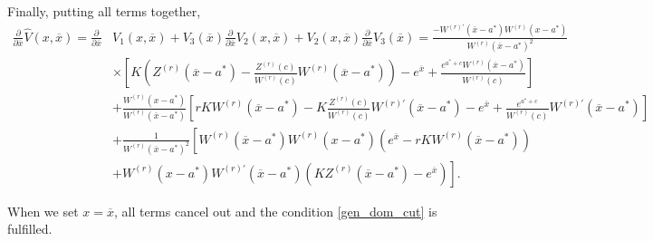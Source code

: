 \documentclass[10pt]{amsart}
\begin{document}
		Finally, putting all terms together,
		\begin{align}
			\frac{\partial}{\partial \overline{x}} \hat{V}(x, \overline{x})=\frac{\partial}{\partial \overline{x}}& V_1(x, \overline{x}) + V_3(\overline{x})\frac{\partial}{\partial \overline{x}} V_2(x, \overline{x}) +  V_2(x, \overline{x})\frac{\partial}{\partial \overline{x}} V_3(\overline{x}) =  \frac{-W^{(r)'}(\overline{x}-a^*)W^{(r)}(x-a^*)}{W^{(r)}(\overline{x}-a^*)^2}
			\\
			\nonumber &\times \left[ K\left( Z^{(r)}(\overline{x}-a^*) - \frac{Z^{(r)}(c)}{W^{(r)}(c)}W^{(r)}(\overline{x}-a^*)\right) - e^{\overline{x}}  + \frac{e^{a^*+c}W^{(r)}(\overline{x}-a^*)}{W^{(r)}(c)}  \right] \\
			\nonumber & + \frac{W^{(r)}(x-a^*)}{W^{(r)}(\overline{x}-a^*)} \left[ rKW^{(r)}(\overline{x}-a^*) - K\frac{Z^{(r)}(c)}{W^{(r)}(c)}W^{(r)'}(\overline{x}-a^*) - e^{\overline{x}} + \frac{e^{a^*+c}}{W^{(r)}(c)}W^{(r)'}(\overline{x}-a^*) \right] \\
			\nonumber & + \frac{1}{W^{(r)}(\overline{x}-a^*)^2} \left[ W^{(r)}(\overline{x}-a^*)W^{(r)}(x-a^*)\left( e^{\overline{x}} - rKW^{(r)}(\overline{x}-a^*) \right) \right. \\
			\nonumber & \left. + W^{(r)}(x-a^*)W^{(r)'}(\overline{x}-a^*) \left( KZ^{(r)}(\overline{x}-a^*) - e^{\overline{x}} \right) \right].
		\end{align}
		
		When we set $x = \overline{x}$, all terms cancel out and the condition \eqref{gen_dom_cut} is fulfilled.
		
		
\end{document}
